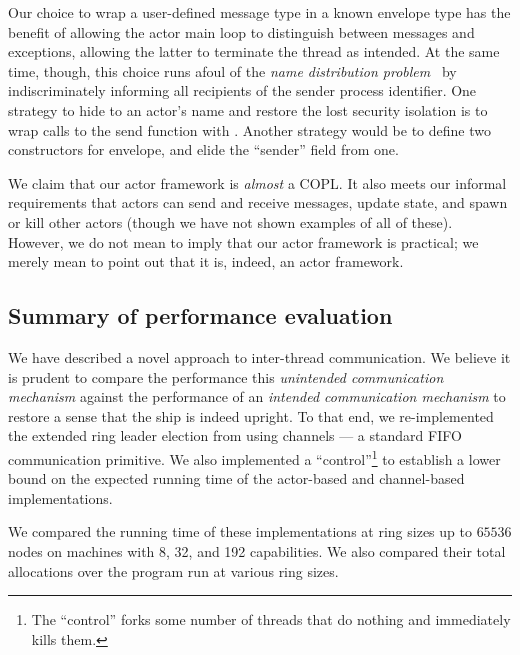 \documentclass[sigplan,screen]{acmart}
\begin{document}
Our choice to wrap a user-defined message type in a known envelope type has the
benefit of allowing the actor main loop to distinguish between messages and
exceptions, allowing the latter to terminate the thread as intended.
%
At the same time, though, this choice runs afoul of the \emph{name distribution problem}~\cite{armstrong2003} by indiscriminately informing all recipients of the sender
process identifier.
%
One strategy to hide to an actor's name and restore the lost security isolation is
to wrap calls to the send function with .
%
Another strategy would be to define two constructors for envelope, and elide
the ``sender'' field from one.

We claim that our actor framework is \emph{almost} a COPL.
%
It also meets our informal requirements that actors can send and receive
messages, update state, and spawn or kill other actors (though we have not
shown examples of all of these).
%
However, we do not mean to imply that our actor framework is practical; we
merely mean to point out that it is, indeed, an actor framework.





\subsection{Summary of performance evaluation}

We have described a novel approach to inter-thread communication.
%
We believe it
is prudent to compare the performance this \emph{unintended communication
mechanism} against the performance of an \emph{intended communication
mechanism} to restore a sense that the ship is indeed upright.
%
To that end,
we re-implemented the extended ring leader election from 
using channels --- a standard FIFO communication primitive.
%
We also implemented a ``control''\footnote{
    The ``control'' forks some number of threads that do nothing and
    immediately kills them.
} to establish a lower bound on the expected
running time of the actor-based and channel-based implementations.

%
We compared the running time of these implementations
at ring sizes up to $65536$ nodes on machines with 8, 32, and 192
capabilities.
%
We also compared their total allocations over the program run at various ring
sizes.
\end{document}
